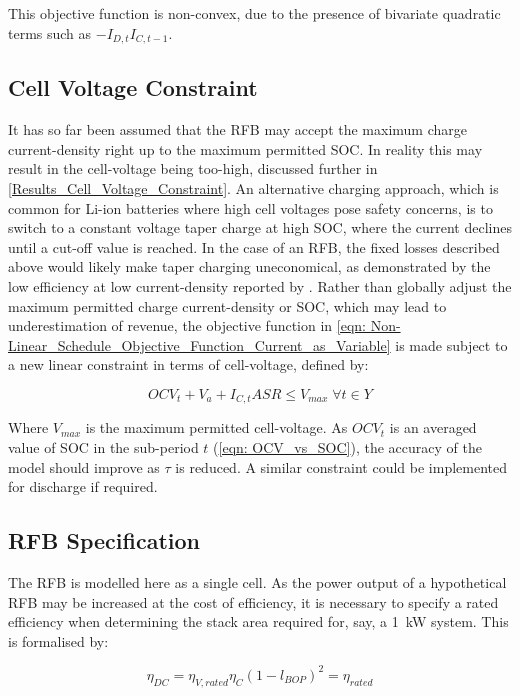 \documentclass[preprint,3p,review,authoryear,10pt]{elsarticle}
\begin{document}
This objective function is non-convex, due to the presence of bivariate quadratic terms such as $-I_{D,t}I_{C,t-1}$. 


\subsection{Cell Voltage Constraint}
\label{Model_Formulation_Constraint_Cell_Voltage}
It has so far been assumed that the RFB may accept the maximum charge current-density right up to the maximum permitted SOC. In reality this may result in the cell-voltage being too-high, discussed further in \cref{Results_Cell_Voltage_Constraint}. An alternative charging approach, which is common for Li-ion batteries where high cell voltages pose safety concerns, is to switch to a constant voltage taper charge at high SOC, where the current declines until a cut-off value is reached. In the case of an RFB, the fixed losses described above would likely make taper charging uneconomical, as demonstrated by the low efficiency at low current-density reported by \cite{Nguyen2014}. Rather than globally adjust the maximum permitted charge current-density or SOC, which may lead to underestimation of revenue, the objective function in \cref{eqn: Non-Linear_Schedule_Objective_Function_Current_as_Variable} is made subject to a new linear constraint in terms of cell-voltage, defined by:
    
    \begin{equation}
\label{eqn: Cell_Voltage_Constraint}
OCV_t + V_a + I_{C,t}ASR \leq V_{max} \; \forall t \in Y
\end{equation}

Where $V_{max}$ is the maximum permitted cell-voltage. As $OCV_t$ is an averaged value of SOC in the sub-period $t$ (\cref{eqn: OCV_vs_SOC}), the accuracy of the model should improve as $\tau$ is reduced. A similar constraint could be implemented for discharge if required.

\subsection{RFB Specification}
\label{VRFB_specification}
The RFB is modelled here as a single cell. As the power output of a hypothetical RFB may be increased at the cost of efficiency, it is necessary to specify a rated efficiency when determining the stack area required for, say, a \SI{1}{\kilo\watt} system. This is formalised by:

\begin{equation}
\label{eqn: Rated_efficiency}
\eta_{DC} = \eta_{V,rated}\eta_{C}(1-l_{BOP})^2 = \eta_{rated}
\end{equation}
\end{document}
